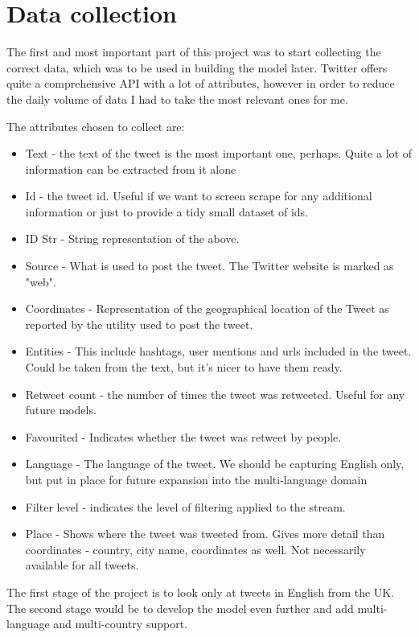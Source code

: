 \documentclass[minf,frontabs,twoside,singlespacing,parskip]{infthesis}
\begin{document}
\chapter{Data collection}

The first and most important part of this project was to start collecting the correct data, which was to be used in building the model later. Twitter offers quite a comprehensive API with a lot of attributes, however in order to reduce the daily volume of data I had to take the most relevant ones for me. 

The attributes chosen to collect are:
\begin{itemize}
\item Text - the text of the tweet is the most important one, perhaps. Quite a lot of information can be extracted from it alone
\item Id - the tweet id. Useful if we want to screen scrape for any additional information or just to provide a tidy small dataset of ids.
\item ID Str - String representation of the above.
\item Source - What is used to post the tweet. The Twitter website is marked as "web".
\item Coordinates  - Representation of the geographical location of the Tweet as reported by the utility used to post the tweet.
\item Entities - This include hashtags, user mentions and urls included in the tweet. Could be taken from the text, but it's nicer to have them ready.
\item Retweet count - the number of times the tweet was retweeted. Useful for any future models. 
\item Favourited - Indicates whether the tweet was retweet by people. 
\item Language - The language of the tweet. We should be capturing English only, but put in place for future expansion into the multi-language domain
\item Filter level - indicates the level of filtering applied to the stream.
\item Place - Shows where the tweet was tweeted from. Gives more detail than coordinates - country, city name, coordinates as well. Not necessarily available for all tweets.
\end{itemize}

The first stage of the project is to look only at tweets in English from the UK. The second stage would be to develop the model even further and add multi-language and multi-country support. 
\end{document}
